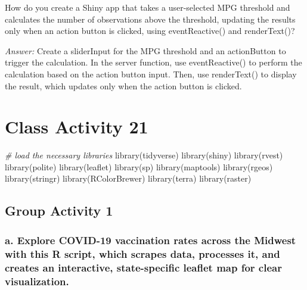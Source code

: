 \documentclass[
]{book}
\newenvironment{Shaded}{\begin{snugshade}}{\end{snugshade}}
\newcommand{\CommentTok}[1]{\textcolor[rgb]{0.56,0.35,0.01}{\textit{#1}}}
\newcommand{\FunctionTok}[1]{\textcolor[rgb]{0.00,0.00,0.00}{#1}}
\newcommand{\NormalTok}[1]{#1}
\begin{document}
How do you create a Shiny app that takes a user-selected MPG threshold and calculates the number of observations above the threshold, updating the results only when an action button is clicked, using eventReactive() and renderText()?

\emph{Answer:} Create a sliderInput for the MPG threshold and an actionButton to trigger the calculation. In the server function, use eventReactive() to perform the calculation based on the action button input. Then, use renderText() to display the result, which updates only when the action button is clicked.

\hypertarget{class-activity-21}{%
\chapter{Class Activity 21}\label{class-activity-21}}

\begin{Shaded}
\begin{Highlighting}[]
\CommentTok{\# load the necessary libraries}
\FunctionTok{library}\NormalTok{(tidyverse)}
\FunctionTok{library}\NormalTok{(shiny)}
\FunctionTok{library}\NormalTok{(rvest)}
\FunctionTok{library}\NormalTok{(polite)}
\FunctionTok{library}\NormalTok{(leaflet)}
\FunctionTok{library}\NormalTok{(sp)}
\FunctionTok{library}\NormalTok{(maptools)}
\FunctionTok{library}\NormalTok{(rgeos)}
\FunctionTok{library}\NormalTok{(stringr)}
\FunctionTok{library}\NormalTok{(RColorBrewer)}
\FunctionTok{library}\NormalTok{(terra)}
\FunctionTok{library}\NormalTok{(raster)}
\end{Highlighting}
\end{Shaded}

\hypertarget{group-activity-1-5}{%
\section{Group Activity 1}\label{group-activity-1-5}}

\hypertarget{a.-explore-covid-19-vaccination-rates-across-the-midwest-with-this-r-script-which-scrapes-data-processes-it-and-creates-an-interactive-state-specific-leaflet-map-for-clear-visualization.}{%
\subsection{a. Explore COVID-19 vaccination rates across the Midwest with this R script, which scrapes data, processes it, and creates an interactive, state-specific leaflet map for clear visualization.}\label{a.-explore-covid-19-vaccination-rates-across-the-midwest-with-this-r-script-which-scrapes-data-processes-it-and-creates-an-interactive-state-specific-leaflet-map-for-clear-visualization.}}
\end{document}
